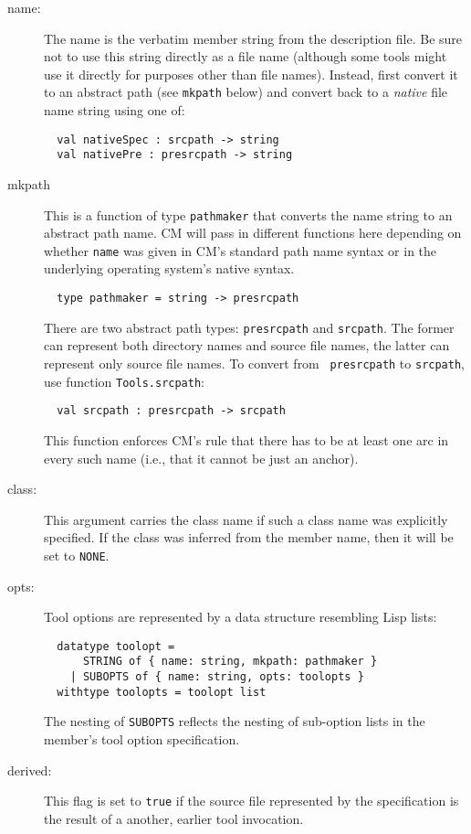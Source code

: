 \begin{description}
\item[name:] The name is the verbatim member string from the
description file.  Be sure not to use this string directly as a file
name (although some tools might use it directly for purposes other
than file names).  Instead, first convert it to an abstract path (see
{\tt mkpath} below) and convert back to a {\em native} file name
string using one of:
\begin{verbatim}
  val nativeSpec : srcpath -> string
  val nativePre : presrcpath -> string
\end{verbatim}
\item[mkpath] This is a function of type {\tt pathmaker} that converts
the name string to an abstract path name.  CM will pass in different
functions here depending on whether {\tt name} was given in CM's
standard path name syntax or in the underlying operating system's
native syntax.
\begin{verbatim}
  type pathmaker = string -> presrcpath
\end{verbatim}
There are two abstract path types: {\tt presrcpath} and {\tt srcpath}.
The former can represent both directory names and source file names,
the latter can represent only source file names.  To convert from {\tt
presrcpath} to {\tt srcpath}, use function {\tt Tools.srcpath}:
\begin{verbatim}
  val srcpath : presrcpath -> srcpath
\end{verbatim}
This function enforces CM's rule that there has to be at least one arc
in every such name (i.e., that it cannot be just an anchor).
\item[class:] This argument carries the class name if such a class
name was explicitly specified.  If the class was inferred from the
member name, then it will be set to {\tt NONE}.
\item[opts:] Tool options are represented by a data structure
resembling Lisp lists:
\begin{verbatim}
  datatype toolopt =
      STRING of { name: string, mkpath: pathmaker }
    | SUBOPTS of { name: string, opts: toolopts }
  withtype toolopts = toolopt list
\end{verbatim}
The nesting of {\tt SUBOPTS} reflects the nesting of sub-option lists
in the member's tool option specification.
\item[derived:] This flag is set to {\tt true} if the source file
represented by the specification is the result of a another, earlier
tool invocation.
\end{description}

